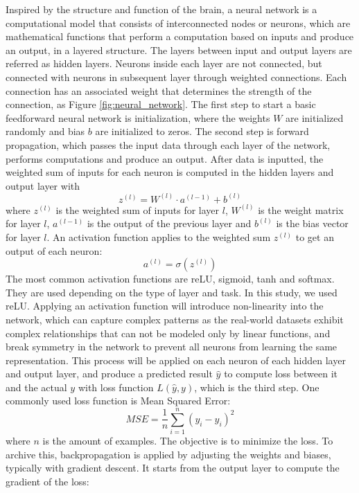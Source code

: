 \documentclass[12pt,a4paper,english
]{tunithesis}
\begin{document}
Inspired by the structure and function of the brain, a neural network is a computational model that consists of  interconnected nodes or neurons, which are mathematical functions that perform a computation based on inputs and produce an output, in a layered structure. The layers between input and output layers are referred as hidden layers. Neurons inside each layer are not connected, but connected with neurons in subsequent layer through weighted connections. Each connection has an associated weight that determines the strength of the connection, as Figure \ref{fig:neural_network}. The first step to start a basic feedforward neural network is initialization, where the weights $W$ are initialized randomly and bias $b$ are initialized to zeros. The second step is forward propagation, which passes the input data through each layer of the network, performs computations and produce an output. After data is inputted, the weighted sum of inputs for each neuron is computed in the hidden layers and output layer with
\begin{equation}
    z^{(l)}=W^{(l)} \cdot a^{(l-1)}+b^{(l)}
\end{equation}
where $z^{(l)}$ is the weighted sum of inputs for layer $l$, $W^{(l)}$ is the weight matrix for layer $l$, $a^{(l-1)}$ is the output of the previous layer and $b^{(l)}$ is the bias vector for layer $l$. An activation function applies to the weighted sum $z^{(l)}$ to get an output of each neuron:
\begin{equation}
    a^{(l)}=\sigma\left(z^{(l)}\right)
\end{equation}
The most common activation functions are reLU, sigmoid, tanh and softmax. They are used depending on the type of layer and task. In this study, we used reLU. Applying an activation function will introduce non-linearity into the network, which can capture complex patterns as the real-world datasets exhibit complex relationships that can not be modeled only by linear functions, and break symmetry in the network to prevent all neurons from learning the same representation. This process will be applied on each neuron of each hidden layer and output layer, and produce a predicted result $\hat{y}$ to compute loss between it and the actual $y$ with loss function $L(\hat{y}, y)$, which is the third step. One commonly used loss function is Mean Squared Error:
\begin{equation}
    M S E=\frac{1}{n} \sum_{i=1}^n\left(y_i-\hat{y}_i\right)^2
\end{equation}
where $n$ is the amount of examples. The objective is to minimize the loss. To archive this, backpropagation is applied by adjusting the weights and biases, typically with gradient descent. It starts from the output layer to compute the gradient of the loss:
\end{document}
